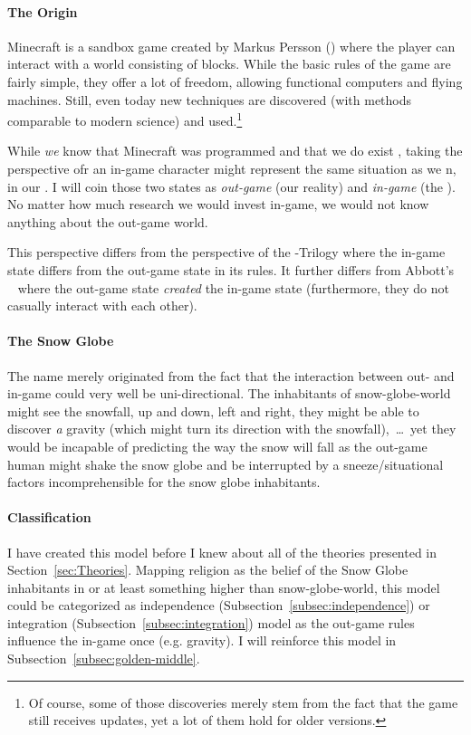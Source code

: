 \paragraph{The Origin} Minecraft is a sandbox game created by Markus Persson () where the player can interact with a world consisting of blocks. While the basic rules of the game are fairly simple, they offer a lot of freedom, allowing functional computers and flying machines. Still, even today new techniques are discovered (with methods comparable to modern science) and used.\footnote{Of course, some of those discoveries merely stem from the fact that the game still receives updates, yet a lot of them hold for older versions.}

While \emph{we} know that Minecraft was programmed and that we do exist , taking the perspective ofr an in-game character might represent the same situation as we     n, in our . I will coin those two states as \emph{out-game} (our reality) and \emph{in-game} (the ).
No matter how much research we would invest in-game, we would not know anything about the out-game world.

This perspective differs from the perspective of the -Trilogy where the in-game state differs from the out-game state in its rules.
It further differs from Abbott's ~\cite{abbott1987flatland} where the out-game state \emph{created} the in-game state (furthermore, they do not casually interact with each other).

\paragraph{The Snow Globe}
The name  merely originated from the fact that the interaction between out- and in-game could very well be uni-directional.
The inhabitants of snow-globe-world might see the snowfall, up and down, left and right, they might be able to discover \textit{a} gravity (which might turn its direction with the snowfall),~\ldots\ yet they would be incapable of predicting the way the snow will fall as the out-game human might shake the snow globe and be interrupted by a sneeze/situational factors incomprehensible for the snow globe inhabitants.


\paragraph{Classification}
I have created this model before I knew about all of the theories presented in Section~\ref{sec:Theories}. Mapping religion as the belief of the Snow Globe inhabitants in  or at least something higher than snow-globe-world, this model could be categorized as independence (Subsection~\ref{subsec:independence}) or integration (Subsection~\ref{subsec:integration}) model as the out-game rules influence the in-game once (e.g. gravity).
I will reinforce this model in Subsection~\ref{subsec:golden-middle}.

